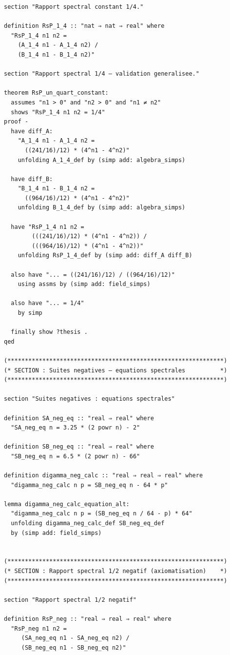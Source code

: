 \documentclass[a4paper,11pt]{article}
\begin{document}
\begin{holcode}[title={\textcolor{white}{File: methode\_spectral.thy -- Part 3/4}}]
\begin{lstlisting}
section "Rapport spectral constant 1/4."

definition RsP_1_4 :: "nat ⇒ nat ⇒ real" where
  "RsP_1_4 n1 n2 =
    (A_1_4 n1 - A_1_4 n2) /
    (B_1_4 n1 - B_1_4 n2)"

section "Rapport spectral 1/4 – validation generalisee."

theorem RsP_un_quart_constant:
  assumes "n1 > 0" and "n2 > 0" and "n1 ≠ n2"
  shows "RsP_1_4 n1 n2 = 1/4"
proof -
  have diff_A:
    "A_1_4 n1 - A_1_4 n2 =
      ((241/16)/12) * (4^n1 - 4^n2)"
    unfolding A_1_4_def by (simp add: algebra_simps)

  have diff_B:
    "B_1_4 n1 - B_1_4 n2 =
      ((964/16)/12) * (4^n1 - 4^n2)"
    unfolding B_1_4_def by (simp add: algebra_simps)

  have "RsP_1_4 n1 n2 =
        (((241/16)/12) * (4^n1 - 4^n2)) /
        (((964/16)/12) * (4^n1 - 4^n2))"
    unfolding RsP_1_4_def by (simp add: diff_A diff_B)

  also have "... = ((241/16)/12) / ((964/16)/12)"
    using assms by (simp add: field_simps)

  also have "... = 1/4"
    by simp

  finally show ?thesis .
qed

(**************************************************************)
(* SECTION : Suites negatives – equations spectrales          *)
(**************************************************************)

section "Suites negatives : equations spectrales"

definition SA_neg_eq :: "real ⇒ real" where
  "SA_neg_eq n = 3.25 * (2 powr n) - 2"

definition SB_neg_eq :: "real ⇒ real" where
  "SB_neg_eq n = 6.5 * (2 powr n) - 66"

definition digamma_neg_calc :: "real ⇒ real ⇒ real" where
  "digamma_neg_calc n p = SB_neg_eq n - 64 * p"

lemma digamma_neg_calc_equation_alt:
  "digamma_neg_calc n p = (SB_neg_eq n / 64 - p) * 64"
  unfolding digamma_neg_calc_def SB_neg_eq_def
  by (simp add: field_simps)


(**************************************************************)
(* SECTION : Rapport spectral 1/2 negatif (axiomatisation)    *)
(**************************************************************)

section "Rapport spectral 1/2 negatif"

definition RsP_neg :: "real ⇒ real ⇒ real" where
  "RsP_neg n1 n2 =
     (SA_neg_eq n1 - SA_neg_eq n2) /
     (SB_neg_eq n1 - SB_neg_eq n2)"


\end{lstlisting}
\end{holcode}
\end{document}
